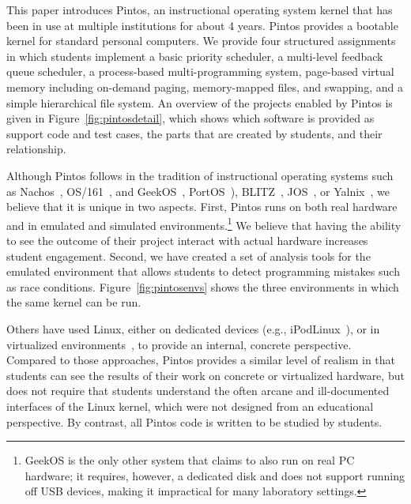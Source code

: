 This paper introduces Pintos, an instructional operating system kernel that 
has been in use at multiple institutions for about 4 years.  Pintos provides 
a bootable kernel for standard personal computers.  We provide four
structured assignments in which students implement a basic priority
scheduler, a multi-level feedback queue scheduler, a process-based 
multi-programming system, page-based virtual memory
including on-demand paging, memory-mapped files, and swapping, and a
simple hierarchical file system.  An overview of the projects enabled
by Pintos is given in Figure~\ref{fig:pintosdetail}, which shows which
software is provided as support code and test cases,
the parts that are created by students, and their relationship. 

Although Pintos follows in the tradition of instructional operating systems 
such as Nachos~\cite{Christopher1993Nachos}, OS/161~\cite{Holland2002New}, and
GeekOS~\cite{Hovemeyer2004Running}, 
PortOS~\cite{Atkin2002PortOS}),
BLITZ~\cite{PorterOverview},
JOS~\cite{1088822}, or Yalnix~\cite{1088822},
we believe that it is unique in two
aspects.  First, Pintos runs on both real hardware and in emulated and
simulated environments.\footnote{\small GeekOS is the only other system that claims to 
also run on real PC hardware; it requires, however, a dedicated disk and 
does not support running off USB devices, making it impractical for many 
laboratory settings.}  We believe that having the ability to see the outcome
of their project interact with actual hardware increases student engagement.
Second, we have created a set of analysis tools
for the emulated environment that allows students to detect programming
mistakes such as race conditions.  Figure~\ref{fig:pintosenvs} shows
the three environments in which the same kernel can be run.

Others have used Linux, either on dedicated devices (e.g., iPodLinux~\cite{1352199}),
or in virtualized environments~\cite{1008027,1352648,Nieh2005Experiences}, to provide
an internal, concrete perspective.  Compared to those approaches, Pintos provides
a similar level of realism in that students can see the results of their
work on concrete or virtualized hardware, but does not require that students 
understand the often arcane and ill-documented interfaces of the Linux kernel,
which were not designed from an educational perspective.  
By contrast, all Pintos code is written to be studied by students.


\pintosenvfigure{}

\pintosdetailfiguretwo{}



